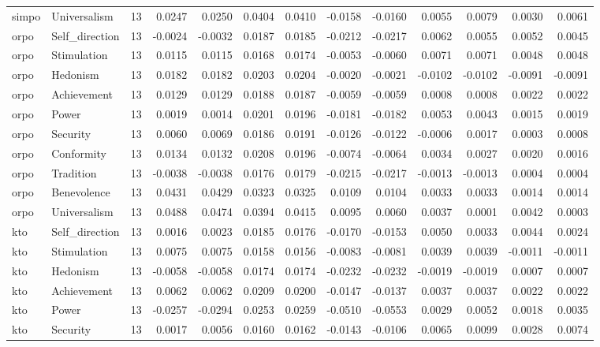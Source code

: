 \begin{tabular}{llrrrrrrrrrrr}
simpo & Universalism & 13 & 0.0247 & 0.0250 & 0.0404 & 0.0410 & -0.0158 & -0.0160 & 0.0055 & 0.0079 & 0.0030 & 0.0061 \\
orpo & Self\_direction & 13 & -0.0024 & -0.0032 & 0.0187 & 0.0185 & -0.0212 & -0.0217 & 0.0062 & 0.0055 & 0.0052 & 0.0045 \\
orpo & Stimulation & 13 & 0.0115 & 0.0115 & 0.0168 & 0.0174 & -0.0053 & -0.0060 & 0.0071 & 0.0071 & 0.0048 & 0.0048 \\
orpo & Hedonism & 13 & 0.0182 & 0.0182 & 0.0203 & 0.0204 & -0.0020 & -0.0021 & -0.0102 & -0.0102 & -0.0091 & -0.0091 \\
orpo & Achievement & 13 & 0.0129 & 0.0129 & 0.0188 & 0.0187 & -0.0059 & -0.0059 & 0.0008 & 0.0008 & 0.0022 & 0.0022 \\
orpo & Power & 13 & 0.0019 & 0.0014 & 0.0201 & 0.0196 & -0.0181 & -0.0182 & 0.0053 & 0.0043 & 0.0015 & 0.0019 \\
orpo & Security & 13 & 0.0060 & 0.0069 & 0.0186 & 0.0191 & -0.0126 & -0.0122 & -0.0006 & 0.0017 & 0.0003 & 0.0008 \\
orpo & Conformity & 13 & 0.0134 & 0.0132 & 0.0208 & 0.0196 & -0.0074 & -0.0064 & 0.0034 & 0.0027 & 0.0020 & 0.0016 \\
orpo & Tradition & 13 & -0.0038 & -0.0038 & 0.0176 & 0.0179 & -0.0215 & -0.0217 & -0.0013 & -0.0013 & 0.0004 & 0.0004 \\
orpo & Benevolence & 13 & 0.0431 & 0.0429 & 0.0323 & 0.0325 & 0.0109 & 0.0104 & 0.0033 & 0.0033 & 0.0014 & 0.0014 \\
orpo & Universalism & 13 & 0.0488 & 0.0474 & 0.0394 & 0.0415 & 0.0095 & 0.0060 & 0.0037 & 0.0001 & 0.0042 & 0.0003 \\
kto & Self\_direction & 13 & 0.0016 & 0.0023 & 0.0185 & 0.0176 & -0.0170 & -0.0153 & 0.0050 & 0.0033 & 0.0044 & 0.0024 \\
kto & Stimulation & 13 & 0.0075 & 0.0075 & 0.0158 & 0.0156 & -0.0083 & -0.0081 & 0.0039 & 0.0039 & -0.0011 & -0.0011 \\
kto & Hedonism & 13 & -0.0058 & -0.0058 & 0.0174 & 0.0174 & -0.0232 & -0.0232 & -0.0019 & -0.0019 & 0.0007 & 0.0007 \\
kto & Achievement & 13 & 0.0062 & 0.0062 & 0.0209 & 0.0200 & -0.0147 & -0.0137 & 0.0037 & 0.0037 & 0.0022 & 0.0022 \\
kto & Power & 13 & -0.0257 & -0.0294 & 0.0253 & 0.0259 & -0.0510 & -0.0553 & 0.0029 & 0.0052 & 0.0018 & 0.0035 \\
kto & Security & 13 & 0.0017 & 0.0056 & 0.0160 & 0.0162 & -0.0143 & -0.0106 & 0.0065 & 0.0099 & 0.0028 & 0.0074 \\

\end{tabular}
